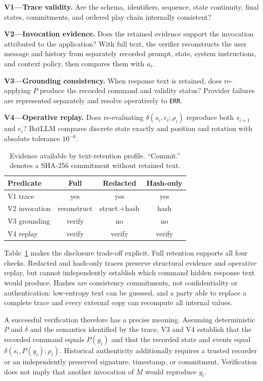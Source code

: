 \documentclass[conference,a4paper]{IEEEtran}
\begin{document}
\textbf{V1---Trace validity.} Are the schema, identifiers, sequence, state continuity, final states, commitments, and ordered play chain internally consistent?

\textbf{V2---Invocation evidence.} Does the retained evidence support the invocation attributed to the application? With full text, the verifier reconstructs the user message and history from separately recorded prompt, state, system instructions, and context policy, then compares them with $a_i$.

\textbf{V3---Grounding consistency.} When response text is retained, does re-applying $P$ produce the recorded command and validity status? Provider failures are represented separately and resolve operatively to \texttt{ERR}.

\textbf{V4---Operative replay.} Does re-evaluating $\delta(s_i,c_i;\rho_i)$ reproduce both $s_{i+1}$ and $e_i$? BatLLM compares discrete state exactly and position and rotation with absolute tolerance $10^{-6}$.

\begin{table}[t]
\caption{Evidence available by text-retention profile. ``Commit.'' denotes a SHA-256 commitment without retained text.}
\label{tab:profiles}
\centering
\small
\begin{tabular}{@{}lccc@{}}
\toprule
Predicate & Full & Redacted & Hash-only \\
\midrule
V1 trace & yes & yes & yes \\
V2 invocation & reconstruct & struct.+hash & hash \\
V3 grounding & verify & no & no \\
V4 replay & verify & verify & verify \\
\bottomrule
\end{tabular}
\end{table}

Table~\ref{tab:profiles} makes the disclosure trade-off explicit. Full retention supports all four checks. Redacted and hash-only traces preserve structural evidence and operative replay, but cannot independently establish which command hidden response text would produce. Hashes are consistency commitments, not confidentiality or authentication: low-entropy text can be guessed, and a party able to replace a complete trace and every external copy can recompute all internal values.

A successful verification therefore has a precise meaning. Assuming deterministic $P$ and $\delta$ and the semantics identified by the trace, V3 and V4 establish that the recorded command equals $P(y_i)$ and that the recorded state and events equal $\delta(s_i,P(y_i);\rho_i)$. Historical authenticity additionally requires a trusted recorder or an independently preserved signature, timestamp, or commitment. Verification does not imply that another invocation of $M$ would reproduce $y_i$.
\end{document}
